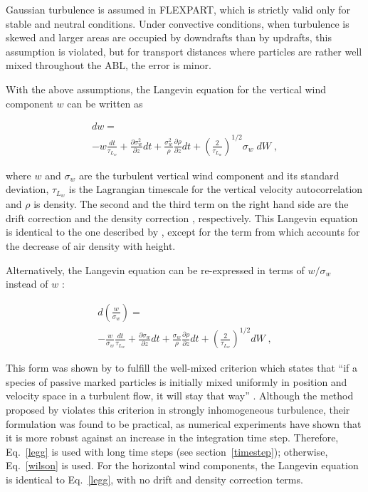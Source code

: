 \documentclass{egu}            %
\begin{document}
Gaussian turbulence is assumed in FLEXPART, which is strictly valid only for
stable and neutral conditions.  Under convective conditions, when turbulence is
skewed and larger areas are occupied by downdrafts than by updrafts, this
assumption is violated, but for transport distances where particles are rather
well mixed throughout the ABL, the error is minor.

With the above assumptions, the Langevin equation for the vertical wind
component $w$ can be written as

\begin{multline}
d w = \\
- w \frac{dt}{\tau_{L_w}}
+ \frac{\partial \sigma_w^2}{\partial z} dt
+ \frac{\sigma_w^2}{\rho} \frac{\partial \rho}{\partial z} dt
+ \left( \frac{2}{\tau_{L_w}} \right)^{1/2} \sigma_w\; dW \;,
\label{legg}
\end{multline}

where $w$ and $\sigma_w$ are the turbulent vertical wind component and its
standard deviation, $\tau_{L_w}$ is the Lagrangian timescale for the vertical
velocity autocorrelation and $\rho$ is density.  The second and the third term
on the right hand side are the drift correction \citep{mcnider1988} and the
density correction \citep{stohlthomson1999}, respectively.  This Langevin
equation is identical to the one described by \citet{legg1982}, except for the
term from \citet{stohlthomson1999} which accounts for the decrease of air
density with height.

Alternatively, the Langevin equation can be re-expressed in terms of
$w/\sigma_w$ instead of $w$ \citep{wilson1983}:

\begin{multline}
d \left( \frac{w}{\sigma_w} \right) =\\
- \frac{w}{\sigma_w} \frac{dt}{\tau_{L_w}}
+ \frac{\partial \sigma_w}{\partial z} dt
+ \frac{\sigma_w}{\rho} \frac{\partial \rho}{\partial z} dt
+ \left( \frac{2}{\tau_{L_w}} \right)^{1/2} dW \;,
\label{wilson}
\end{multline}

This form was shown by \citet{thomson1987} to fulfill the well-mixed criterion
which states that ``if a species of passive marked particles is initially mixed
uniformly in position and velocity space in a turbulent flow, it will stay that
way'' \citep{rodean1996}.  Although the method proposed by \citet{legg1982}
violates this criterion in strongly inhomogeneous turbulence, their formulation
was found to be practical, as numerical experiments have shown that it is more
robust against an increase in the integration time step.  Therefore,
Eq.~\ref{legg} is used with long time steps (see section~\ref{timestep});
otherwise, Eq.~\ref{wilson} is used.  For the horizontal wind components, the
Langevin equation is identical to Eq.~\ref{legg}, with no drift and density
correction terms.
\end{document}
